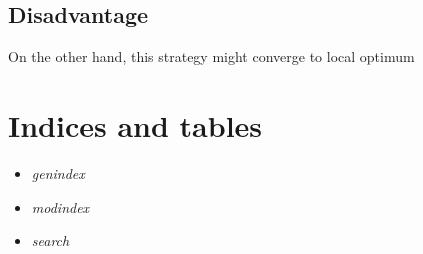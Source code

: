 \documentclass[letterpaper,10pt,english]{sphinxmanual}
\begin{document}
\section{Disadvantage}
\label{zoomin:disadvantage}
On the other hand, this strategy might converge to local optimum


\chapter{Indices and tables}
\label{index:indices-and-tables}\begin{itemize}
\item {} 
\emph{genindex}

\item {} 
\emph{modindex}

\item {} 
\emph{search}

\end{itemize}



\renewcommand{\indexname}{Index}
\printindex
\end{document}
